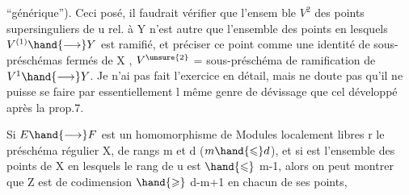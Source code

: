 
 ``générique'').   Ceci posé, il faudrait vérifier que l'ensem ble $V^2$
des points supersinguliers de u rel. à Y n'est autre que l'ensemble des
points en lesquels $V^{(1)} \hand{\longrightarrow} Y$ est ramifié, et préciser ce point
comme une identité de sous-préschémas fermés de X , $V^{\unsure{2}}$ = sous-préschéma
de ramification de $V^1 \hand{\longrightarrow} Y$. Je n'ai pas fait l'exercice en détail,
mais ne doute pas qu'il ne puisse se faire par essentiellement l même
 genre de dévissage que cel développé après la prop.7.

 Si $E \hand{\longrightarrow} F$ est un homomorphisme de Modules localement libres r le préschéma régulier
X, de rangs m et d ($m \hand{\leqslant} d$), et si  est l'ensemble des points de X en
lesquels le rang de u est $\hand{\leqslant}$ m-1, alors on peut montrer que Z est de codimension $\hand{\geqslant}$ d-m+1
en chacun de ses points, 


